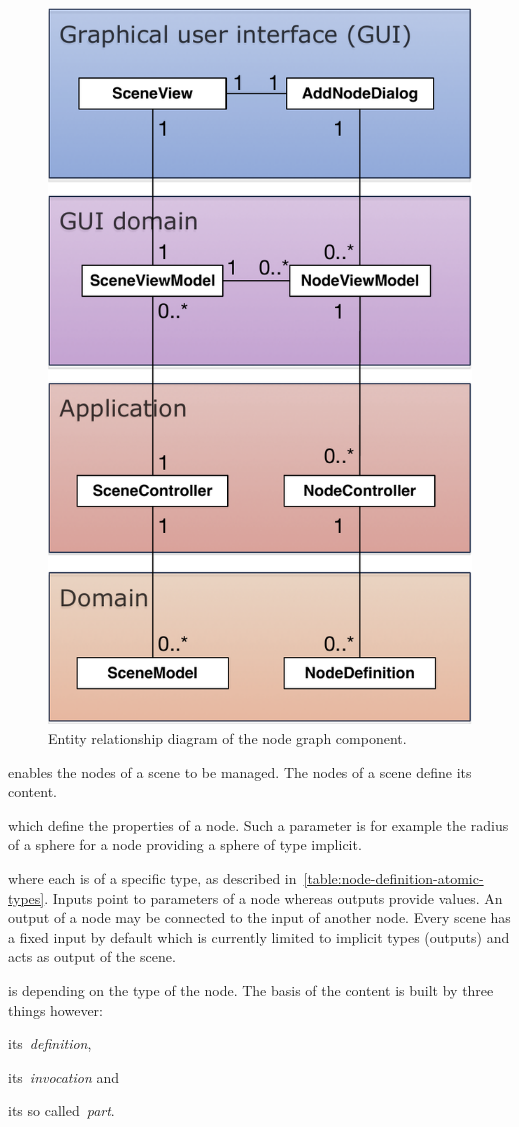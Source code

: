 \documentclass[%
    a4paper,    %
    justified,  %
    nobib,      %
    openany     %
]{tufte-book}
\makeatletter
\renewcommand{\label}[1]{\@tufte@label{##1}}%
\makeatother
\begin{document}
\begin{figure}[!htbp]
  \caption{Entity relationship diagram of the node graph component.}
\label{fig:node-graph-erd}
  \includegraphics[width=0.5\linewidth]{images/node-graph-erd}
\end{figure}

 enables the nodes of a scene to be
managed. The nodes of a scene define its content.

 which define the properties of a node.
Such a parameter is for example the radius of a sphere for a node providing a
sphere of type implicit.

 where each is of a
specific type, as described in~\cref{table:node-definition-atomic-types}. Inputs
point to parameters of a node whereas outputs provide values. An output of a
node may be connected to the input of another node. Every scene has a fixed
input by default which is currently limited to implicit types (outputs) and acts
as output of the scene.

 is depending on the type of the
node. The basis of the content is built by three things however:
\begin{enumerate*}
  \item its~\emph{definition},
  \item its~\emph{invocation} and
  \item its so called~\emph{part}.
\end{enumerate*}
\end{document}
